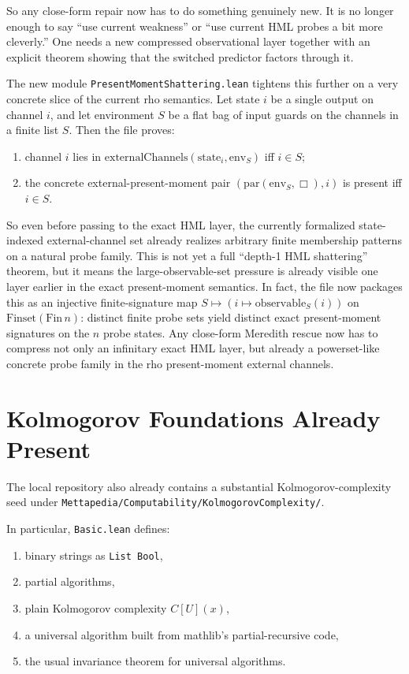 \documentclass[11pt]{article}
\theoremstyle{remark}
\begin{document}
So any close-form repair now has to do something genuinely new.  It is no
longer enough to say ``use current weakness'' or ``use current HML probes a bit
more cleverly.''  One needs a new compressed observational layer together with
an explicit theorem showing that the switched predictor factors through it.

The new module \texttt{PresentMomentShattering.lean} tightens this further on a
very concrete slice of the current rho semantics.  Let state \(i\) be a single
output on channel \(i\), and let environment \(S\) be a flat bag of input
guards on the channels in a finite list \(S\).  Then the file proves:
\begin{enumerate}[leftmargin=1.5em]
  \item channel \(i\) lies in
  \(\mathrm{externalChannels}(\mathrm{state}_i,\mathrm{env}_S)\) iff \(i \in S\);
  \item the concrete external-present-moment pair
  \((\mathrm{par}(\mathrm{env}_S,\Box), i)\) is present iff \(i \in S\).
\end{enumerate}

So even before passing to the exact HML layer, the currently formalized
state-indexed external-channel set already realizes arbitrary finite
membership patterns on a natural probe family.  This is not yet a full
``depth-1 HML shattering'' theorem, but it means the large-observable-set
pressure is already visible one layer earlier in the exact present-moment
semantics.  In fact, the file now packages this as an injective finite-signature
map \(S \mapsto (i \mapsto \mathrm{observable}_S(i))\) on
\(\mathrm{Finset}(\mathrm{Fin}\,n)\): distinct finite probe sets yield distinct
exact present-moment signatures on the \(n\) probe states.  Any close-form
Meredith rescue now has to compress not only an infinitary exact HML layer, but
already a powerset-like concrete probe family in the rho present-moment external channels.

\section{Kolmogorov Foundations Already Present}

The local repository also already contains a substantial Kolmogorov-complexity seed
under \texttt{Mettapedia/Computability/KolmogorovComplexity/}.

In particular, \texttt{Basic.lean} defines:
\begin{enumerate}[leftmargin=1.5em]
  \item binary strings as \texttt{List Bool},
  \item partial algorithms,
  \item plain Kolmogorov complexity \(C[U](x)\),
  \item a universal algorithm built from mathlib's partial-recursive code,
  \item the usual invariance theorem for universal algorithms.
\end{enumerate}
\end{document}
